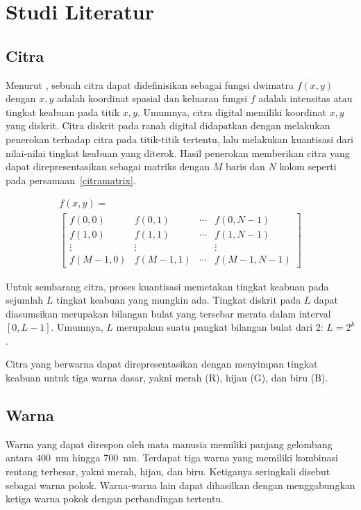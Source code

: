 \documentclass[conference, a4paper]{IEEEtran}
\begin{document}
\section{Studi Literatur}
\subsection{Citra}
Menurut \cite{gonzalez2009digital}, sebuah citra dapat didefinisikan sebagai fungsi dwimatra $f(x, y)$ dengan $x, y$ adalah koordinat spasial dan keluaran fungsi $f$ adalah intensitas atau tingkat keabuan pada titik $x, y$. Umumnya, citra digital memiliki koordinat $x, y$ yang diskrit. Citra diskrit pada ranah digital didapatkan dengan melakukan penerokan terhadap citra pada titik-titik tertentu, lalu melakukan kuantisasi dari nilai-nilai tingkat keabuan yang diterok. Hasil penerokan memberikan citra yang dapat direpresentasikan sebagai matriks dengan $M$ baris dan $N$ kolom seperti pada persamaan~\ref{citramatrix}.

\begin{multline}
  \label{citramatrix}
  f(x,y) = \\
  \left[
    \begin{matrix}
      f(0, 0)   & f(0, 1)   & \cdots & f(0, N-1)   \\
      f(1, 0)   & f(1, 1)   & \cdots & f(1, N-1)   \\
      \vdots    & \vdots    &        & \vdots      \\
      f(M-1, 0) & f(M-1, 1) & \cdots & f(M-1, N-1)
    \end{matrix}
    \right]
\end{multline}

Untuk sembarang citra, proses kuantisasi memetakan tingkat keabuan pada sejumlah $L$ tingkat keabuan yang mungkin ada. Tingkat diskrit pada $L$ dapat diasumsikan merupakan bilangan bulat yang tersebar merata dalam interval $[0, L-1]$. Umumnya, $L$ merupakan suatu pangkat bilangan bulat dari 2: $L = 2^k$.

Citra yang berwarna dapat direpresentasikan dengan menyimpan tingkat keabuan untuk tiga warna dasar, yakni merah (R), hijau (G), dan biru (B).

\subsection{Warna}
Warna yang dapat direspon oleh mata manusia memiliki panjang gelombang antara \qty{400}{\nano\meter} hingga \qty{700}{\nano\meter}. Terdapat tiga warna yang memiliki kombinasi rentang terbesar, yakni merah, hijau, dan biru. Ketiganya seringkali disebut sebagai warna pokok. Warna-warna lain dapat dihasilkan dengan menggabungkan ketiga warna pokok dengan perbandingan tertentu.
\end{document}
